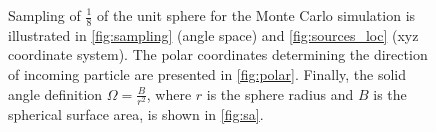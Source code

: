 \begin{figure}[!h]%
\centering
  \newline
  \noindent
  \caption{Sampling of $\frac{1}{8}$ of the unit sphere for the Monte Carlo simulation is illustrated in \ref{fig:sampling} (angle space) and \ref{fig:sources_loc} (xyz coordinate system). 
  The polar coordinates determining the direction of incoming particle are presented in \ref{fig:polar}. 
  Finally, the solid angle definition $\Omega = \frac{B}{r^{2}}$, where $r$ is the sphere radius and $B$ is the spherical surface area, is shown in \ref{fig:sa}. }
  \label{fig:mc_multi}
\end{figure}%

